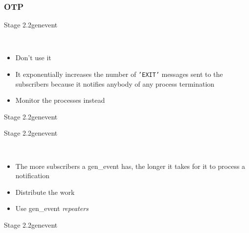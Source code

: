 \documentclass[utf8,hyperref={colorlinks=true}]{beamer}
\begin{document}
\subsubsection{OTP}
\begin{frame}{Stage 2.2}{gen\textunderscore event}
	\begin{description}
		\item<+->[sup\textunderscore handler]\ \\
			\begin{itemize}
				\item Don't use it
				\item It exponentially increases the number of \texttt{'EXIT'} messages sent to the subscribers because it notifies anybody of any process termination
				\item Monitor the processes instead
			\end{itemize}
	\end{description}
\end{frame}
\begin{frame}{Stage 2.2}{gen\textunderscore event}
	\only<1>{\suphandler}
	\only<2>{\suphandlerinfo}
\end{frame}
\begin{frame}{Stage 2.2}{gen\textunderscore event}
	\begin{description}
		\item<+->[Long Delivery Queues]\ \\
			\begin{itemize}
				\item The more subscribers a gen\_event has, the longer it takes for it to process a notification
				\item Distribute the work
				\item Use gen\_event \emph{repeaters}
			\end{itemize}
	\end{description}
\end{frame}
\begin{frame}{Stage 2.2}{gen\textunderscore event}
\repeater
\end{frame}
\end{document}

